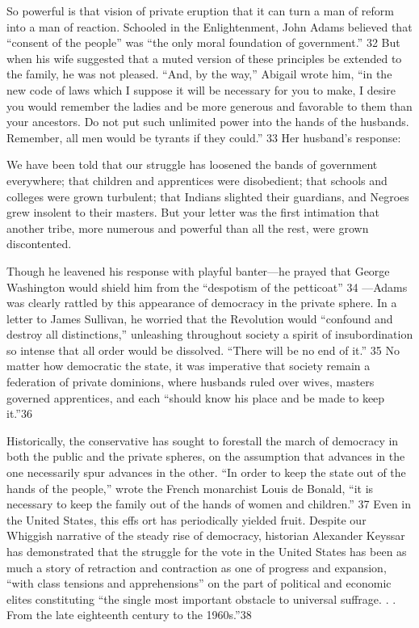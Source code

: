  \par 
So powerful is that vision of private eruption that it can turn a man of reform into a man of reaction. Schooled in the Enlightenment, John Adams believed that “consent of the people” was “the only moral foundation of government.” {\color{blue}32} But when his wife suggested that a muted version of these principles be extended to the family, he was not pleased. “And, by the way,” Abigail wrote him, “in the new code of laws which I suppose it will be necessary for you to make, I desire you would remember the ladies and be more generous and favorable to them than your ancestors. Do not put such unlimited power into the hands of the husbands. Remember, all men would be tyrants if they could.” {\color{blue}33} Her husband’s response:
 \par 
We have been told that our struggle has loosened the bands of government everywhere; that children and apprentices were disobedient; that schools and colleges were grown turbulent; that Indians slighted their guardians, and Negroes grew insolent to their masters. But your letter was the first intimation that another tribe, more numerous and powerful than all the rest, were grown discontented.
 \par 
Though he leavened his response with playful banter—he prayed that George Washington would shield him from the “despotism of the petticoat” {\color{blue}34} —Adams was clearly rattled by this appearance of democracy in the private sphere. In a letter to James Sullivan, he worried that the Revolution would “confound and destroy all distinctions,” unleashing throughout society a spirit of insubordination so intense that all order would be dissolved. “There will be no end of it.” {\color{blue}35} No matter how democratic the state, it was imperative that society remain a federation of private dominions, where husbands ruled over wives, masters governed apprentices, and each “should know his place and be made to keep it.”{\color{blue}36}
 \par 
Historically, the conservative has sought to forestall the march of democracy in both the public and the private spheres, on the assumption that advances in the one necessarily spur advances in the other. “In order to keep the state out of the hands of the people,” wrote the French monarchist Louis de Bonald, “it is necessary to keep the family out of the hands of women and children.” {\color{blue}37} Even in the United States, this effs ort has periodically yielded fruit. Despite our Whiggish narrative of the steady rise of democracy, historian Alexander Keyssar has demonstrated that the struggle for the vote in the United States has been as much a story of retraction and contraction as one of progress and expansion, “with class tensions and apprehensions” on the part of political and economic elites constituting “the single most important obstacle to universal suffrage. . . From the late eighteenth century to the 1960s.”{\color{blue}38}
